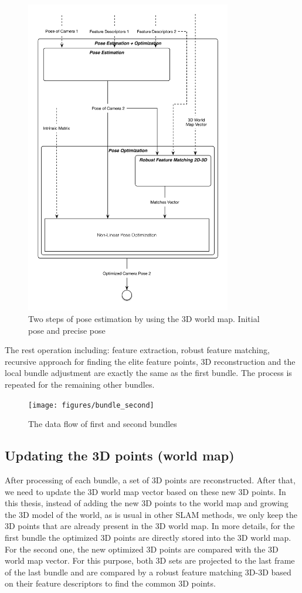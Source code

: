 \begin{figure}[H]
  \centering
  \includegraphics[width=90mm]{figures/pose_estimation_optimization}
  \caption{Two steps of pose estimation by using the 3D world map. Initial pose and precise pose}\label{fig:pose_estimation_optimization}
\end{figure}

The rest operation including: feature extraction, robust feature matching, recursive approach for finding the elite feature points, 3D reconstruction and the local bundle adjustment are exactly the same as the first bundle. The process is repeated for the remaining other bundles. 

\begin{figure}[H]
  \centering
  \texttt{[image: figures/bundle\_second]}
  \caption{The data flow of first and second bundles}\label{fig:bundle_second}
\end{figure}

\subsection{Updating the 3D points (world map)} \label{subsec:update_3d_points}
After processing of each bundle, a set of 3D points are reconstructed. After that, we need to update the 3D world map vector based on these new 3D points. In this thesis, instead of adding the new 3D points to the world map and growing the 3D model of the world, as is usual in other SLAM methods, we only keep the 3D points that are already present in the 3D world map. In more details, for the first bundle the optimized 3D points are directly stored into the 3D world map. For the second one, the new optimized 3D points are compared with the 3D world map vector. For this purpose, both 3D sets are projected to the last frame of the last bundle and are compared by a robust feature matching 3D-3D based on their feature descriptors to find the common 3D points. 

